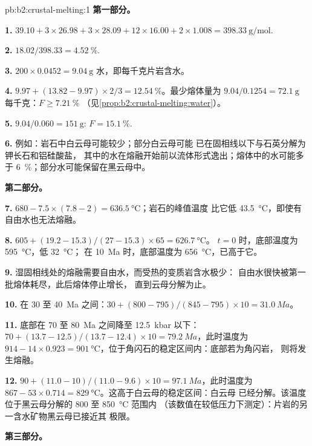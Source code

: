 \begin{solution}{pb:b2:crustal-melting:1}
\noindent\textbf{第一部分。}

\textbf{1.} $39.10 + 3\times26.98 + 3\times28.09 + 12\times16.00 + 2\times1.008 =
\qty{398.33}{\gram\per\mole}$.

\textbf{2.} $18.02/398.33 = \qty{4.52}{\percent}$.

\textbf{3.} $200\times0.0452 = \qty{9.04}{\gram}$ 水，即每千克片岩含水。

\textbf{4.} $9.97 + (13.82 - 9.97)\times2/3 = \qty{12.54}{\percent}$。最少熔体量为
$9.04/0.1254 = \qty{72.1}{\gram}$ 每千克：$F \ge \qty{7.21}{\percent}$
（见\cref{prop:b2:crustal-melting:water}）。

\textbf{5.} $9.04/0.060 = \qty{151}{\gram}$: $F = \qty{15.1}{\percent}$.

\textbf{6.} 例如：岩石中白云母可能较少；部分白云母可能
已在固相线以下与石英分解为钾长石和铝硅酸盐，
其中的水在熔融开始前以流体形式逸出；熔体中的水可能多于
\qty{6}{\percent}；部分水可能保留在黑云母中。

\noindent\textbf{第二部分。}

\textbf{7.} $680 - 7.5\times(7.8 - 2) = \qty{636.5}{\celsius}$；岩石的峰值温度
比它低 \qty{43.5}{\celsius}，即使有自由水也无法熔融。

\textbf{8.} $605 + (19.2 - 15.3)/(27 - 15.3)\times65 = \qty{626.7}{\celsius}$。
$t = 0$ 时，底部温度为 \qty{595}{\celsius}，低 \qty{32}{\celsius}；
在 \qty{10}{Ma} 时，底部温度为 \qty{656}{\celsius}，已高于它。

\textbf{9.} 湿固相线处的熔融需要自由水，而受热的变质岩含水极少：
自由水很快被第一批熔体耗尽，此后熔体停止增长，
直到云母分解为止。

\textbf{10.} 在 30 至 \qty{40}{Ma} 之间：$30 + (800 - 795)/(845 - 795)\times10 =
\qty{31.0}{Ma}$。

\textbf{11.} 底部在 70 至 \qty{80}{Ma} 之间降至 \qty{12.5}{kbar} 以下：
$70 + (13.7 - 12.5)/(13.7 - 12.4)\times10 = \qty{79.2}{Ma}$，此时温度为
$914 - 14\times0.923 = \qty{901}{\celsius}$，位于角闪石的稳定区间内：底部若为角闪岩，
则将发生熔融。

\textbf{12.} $90 + (11.0 - 10)/(11.0 - 9.6)\times10 = \qty{97.1}{Ma}$，此时温度为 $867 -
53\times0.714 = \qty{829}{\celsius}$。这高于白云母的稳定区间：白云母
已经分解。该温度位于黑云母分解的 800 至 \qty{850}{\celsius} 范围内
（该数值在较低压力下测定）：片岩的另一含水矿物黑云母已接近其
极限。

\noindent\textbf{第三部分。}


\end{solution}
